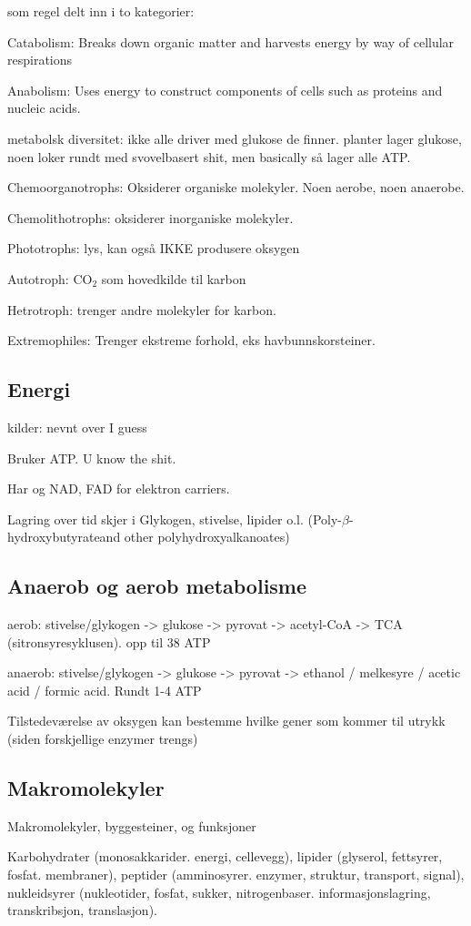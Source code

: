     som regel delt inn i to kategorier: 

    Catabolism: Breaks down organic matter and harvests energy by way of cellular respirations

    Anabolism: Uses energy to construct components of cells such as proteins and nucleic acids.

    metabolsk diversitet: ikke alle driver med glukose de finner. planter lager glukose, noen loker rundt med svovelbasert shit, 
    men basically så lager alle ATP. 

    Chemoorganotrophs: Oksiderer organiske molekyler. Noen aerobe, noen anaerobe. 

    Chemolithotrophs: oksiderer inorganiske molekyler. 

    Phototrophs: lys, kan også IKKE produsere oksygen

    Autotroph: CO$_2$ som hovedkilde til karbon

    Hetrotroph: trenger andre molekyler for karbon. 

    Extremophiles: Trenger ekstreme forhold, eks havbunnskorsteiner.


\subsection{Energi}
    kilder: nevnt over I guess

    Bruker ATP. U know the shit.

    Har og NAD, FAD for elektron carriers. 

    Lagring over tid skjer i Glykogen, stivelse, lipider o.l. (Poly-$\beta$-hydroxybutyrateand other polyhydroxyalkanoates)

\subsection{Anaerob og aerob metabolisme}
    aerob: stivelse/glykogen -> glukose -> pyrovat -> acetyl-CoA -> TCA (sitronsyresyklusen). opp til 38 ATP

    anaerob: stivelse/glykogen -> glukose -> pyrovat -> ethanol / melkesyre / acetic acid / formic acid. Rundt 1-4 ATP

    Tilstedeværelse av oksygen kan bestemme hvilke gener som kommer til utrykk (siden forskjellige enzymer trengs)

\subsection{Makromolekyler}
    Makromolekyler, byggesteiner, og funksjoner

    Karbohydrater (monosakkarider. energi, cellevegg), 
    lipider (glyserol, fettsyrer, fosfat. membraner), 
    peptider (amminosyrer. enzymer, struktur, transport, signal), 
    nukleidsyrer (nukleotider, fosfat, sukker, nitrogenbaser. informasjonslagring, transkribsjon, translasjon). 
   
